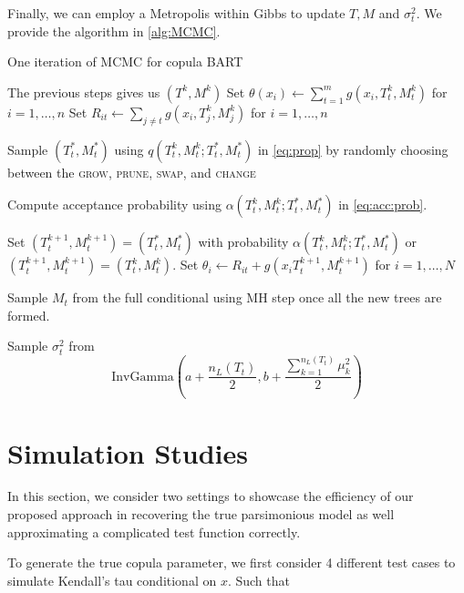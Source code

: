 \documentclass{amsart}
\begin{document}
Finally, we can employ a Metropolis within Gibbs to update $T,M$ and $\sigma_{t}^2$. We provide the algorithm in \cref{alg:MCMC}.
 
\begin{algorithm}
	\caption{One iteration of MCMC for copula BART}\label{alg:MCMC}
	\begin{algorithmic}[1]
		\State The previous steps gives us $(T^k,M^k)$
		\State Set $\theta(x_i) \leftarrow \sum_{t=1}^{m} g(x_i, T^k_t, M^k_t)$ for $i = 1, \ldots, n$
		\State Set $R_{it} \leftarrow \sum_{j\not=t}g(x_i, T_j^k, M_j^k)$ for $i = 1, \ldots, n$
		
		\State Sample $(T_t^\ast, M_t^\ast)$ using $q\left(T_t^k,M_t^k;T_t^\ast, M_t^\ast\right)$ in \cref{eq:prop} by randomly choosing between the \textsc{grow}, \textsc{prune}, \textsc{swap}, and \textsc{change} 
		
		\State Compute acceptance probability using $\alpha\left(T_t^k,M_t^k;T_t^\ast, M_t^\ast\right)$ in \cref{eq:acc:prob}.
		
		\State Set $(T_t^{k+1}, M_t^{k+1})=(T_t^\ast, M_t^\ast)$ with probability $\alpha\left(T_t^k,M_t^k;T_t^\ast, M_t^\ast\right)$ or $(T_t^{k+1}, M_t^{k+1})=(T_t^k,M_t^k)$.
		\State Set $\theta_i \leftarrow R_{it} + g(x_i T_t^{k+1}, M_t^{k+1})$ for $i = 1, \ldots, N$
		
		\State Sample $M_t$ from the full conditional using MH step once all the new trees are formed.
		
		\State Sample $\sigma_{t}^2$ from 
		\begin{equation*}
			\text{InvGamma}\left(a+\frac{n_L(T_t)}{2} , b + \frac{\sum_{k=1}^{n_L(T_t)}\mu_k^2}{2}\right)
		\end{equation*}
		\EndFor
	\end{algorithmic}
\end{algorithm}

\section{Simulation Studies}\label{sec:sim}

In this section, we consider two settings to showcase the efficiency of our proposed approach in recovering the true parsimonious model as well approximating a complicated test function correctly. 

To generate the true copula parameter, we first consider 4 different test cases to simulate Kendall's tau conditional on $x$. Such that
\end{document}
